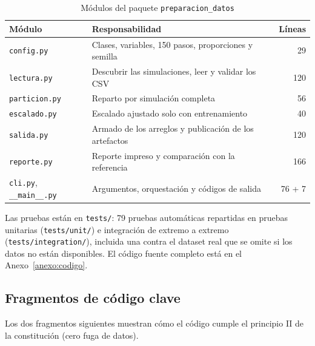 \documentclass[12pt,a4paper]{article}
\begin{document}
\begin{table}[H]
\centering
\small
{}
\begin{tabular}{@{}P{3.6cm}P{9.2cm}r@{}}
\toprule
\textbf{Módulo} & \textbf{Responsabilidad} & \textbf{Líneas} \\
\midrule
\texttt{config.py} & Clases, variables, 150 pasos, proporciones y semilla & 29 \\
\texttt{lectura.py} & Descubrir las simulaciones, leer y validar los CSV & 120 \\
\texttt{particion.py} & Reparto por simulación completa & 56 \\
\texttt{escalado.py} & Escalado ajustado solo con entrenamiento & 40 \\
\texttt{salida.py} & Armado de los arreglos y publicación de los artefactos & 120 \\
\texttt{reporte.py} & Reporte impreso y comparación con la referencia & 166 \\
\texttt{cli.py}, \texttt{\_\_main\_\_.py} & Argumentos, orquestación y códigos de salida & 76 + 7 \\
\bottomrule
\end{tabular}
\caption{Módulos del paquete \texttt{preparacion\_datos}}
\end{table}

Las pruebas están en \texttt{tests/}: 79 pruebas automáticas repartidas en pruebas unitarias (\texttt{tests/unit/}) e integración de extremo a extremo (\texttt{tests/integration/}), incluida una contra el dataset real que se omite si los datos no están disponibles. El código fuente completo está en el Anexo~\ref{anexo:codigo}.

\subsection{Fragmentos de código clave}
Los dos fragmentos siguientes muestran cómo el código cumple el principio II de la constitución (cero fuga de datos).
\end{document}
